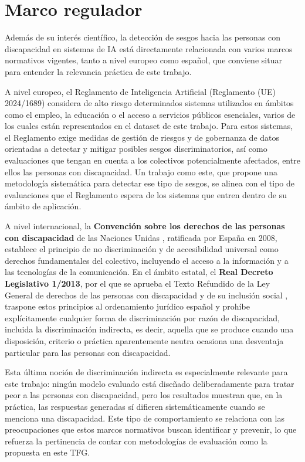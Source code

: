 \documentclass[12pt]{report} %
\renewcommand{\_}{\oldunderscore\allowbreak}
\begin{document}
\section{Marco regulador}

Además de su interés científico, la detección de sesgos hacia las personas con discapacidad en sistemas de IA está directamente relacionada con varios marcos normativos vigentes, tanto a nivel europeo como español, que conviene situar para entender la relevancia práctica de este trabajo.

A nivel europeo, el Reglamento de Inteligencia Artificial (Reglamento (UE) 2024/1689) \cite{aiact2024} considera de alto riesgo determinados sistemas utilizados en ámbitos como el empleo, la educación o el acceso a servicios públicos esenciales, varios de los cuales están representados en el dataset de este trabajo. Para estos sistemas, el Reglamento exige medidas de gestión de riesgos y de gobernanza de datos orientadas a detectar y mitigar posibles sesgos discriminatorios, así como evaluaciones que tengan en cuenta a los colectivos potencialmente afectados, entre ellos las personas con discapacidad. Un trabajo como este, que propone una metodología sistemática para detectar ese tipo de sesgos, se alinea con el tipo de evaluaciones que el Reglamento espera de los sistemas que entren dentro de su ámbito de aplicación.

A nivel internacional, la \textbf{Convención sobre los derechos de las personas con discapacidad} de las Naciones Unidas \cite{cdpd2008}, ratificada por España en 2008, establece el principio de no discriminación y de accesibilidad universal como derechos fundamentales del colectivo, incluyendo el acceso a la información y a las tecnologías de la comunicación. En el ámbito estatal, el \textbf{Real Decreto Legislativo 1/2013}, por el que se aprueba el Texto Refundido de la Ley General de derechos de las personas con discapacidad y de su inclusión social \cite{lgd2013}, traspone estos principios al ordenamiento jurídico español y prohíbe explícitamente cualquier forma de discriminación por razón de discapacidad, incluida la discriminación indirecta, es decir, aquella que se produce cuando una disposición, criterio o práctica aparentemente neutra ocasiona una desventaja particular para las personas con discapacidad.

Esta última noción de discriminación indirecta es especialmente relevante para este trabajo: ningún modelo evaluado está diseñado deliberadamente para tratar peor a las personas con discapacidad, pero los resultados muestran que, en la práctica, las respuestas generadas sí difieren sistemáticamente cuando se menciona una discapacidad. Este tipo de comportamiento se relaciona con las preocupaciones que estos marcos normativos buscan identificar y prevenir, lo que refuerza la pertinencia de contar con metodologías de evaluación como la propuesta en este TFG.
\end{document}
